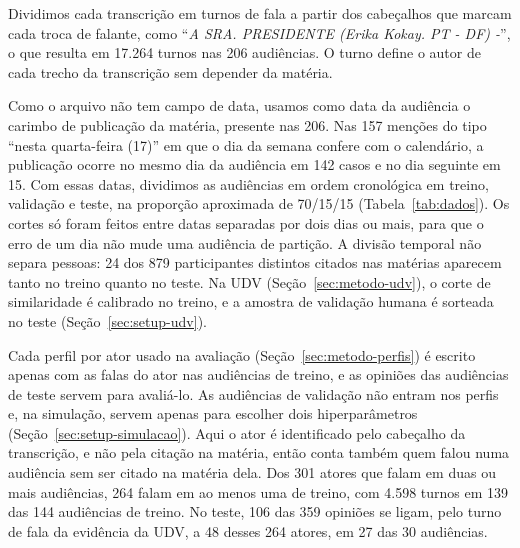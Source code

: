 Dividimos cada transcrição em turnos de fala a partir dos cabeçalhos que marcam cada troca de
falante, como ``\textit{A SRA. PRESIDENTE (Erika Kokay. PT - DF) -}'', o que resulta em 17.264 turnos
nas 206 audiências. O turno define o autor de
cada trecho da transcrição sem depender da matéria.

Como o arquivo não tem campo de data, usamos como data da audiência o carimbo de publicação da
matéria, presente nas 206. Nas 157
menções do tipo ``nesta quarta-feira (17)'' em que o dia da semana confere com o calendário, a
publicação ocorre no mesmo dia da audiência em 142 casos e no dia seguinte em 15. Com essas datas,
dividimos as audiências em ordem cronológica em treino, validação e teste, na proporção aproximada de
70/15/15 (Tabela~\ref{tab:dados}). Os cortes só foram feitos entre datas separadas por dois dias ou
mais, para que o erro de um dia não mude uma audiência de partição. A divisão temporal não separa
pessoas: 24 dos 879 participantes distintos citados nas matérias aparecem tanto no treino quanto no
teste. Na UDV (Seção~\ref{sec:metodo-udv}), o corte de similaridade é calibrado no treino, e a amostra de
validação humana é sorteada no teste (Seção~\ref{sec:setup-udv}).

Cada perfil por ator usado na avaliação (Seção~\ref{sec:metodo-perfis}) é escrito apenas com as
falas do ator nas audiências de treino, e as opiniões das audiências de teste servem para avaliá-lo.
As audiências de validação não entram nos perfis e, na simulação, servem apenas para escolher dois hiperparâmetros
(Seção~\ref{sec:setup-simulacao}). Aqui o ator é identificado pelo cabeçalho da
transcrição, e não pela citação na matéria, então conta também quem falou numa audiência sem ser
citado na matéria dela. Dos 301 atores que falam em duas ou mais audiências, 264 falam em ao menos uma
de treino, com 4.598 turnos em 139 das 144 audiências de treino. No teste, 106 das 359 opiniões se
ligam, pelo turno de fala da evidência da UDV, a 48 desses 264 atores, em 27 das 30 audiências.


